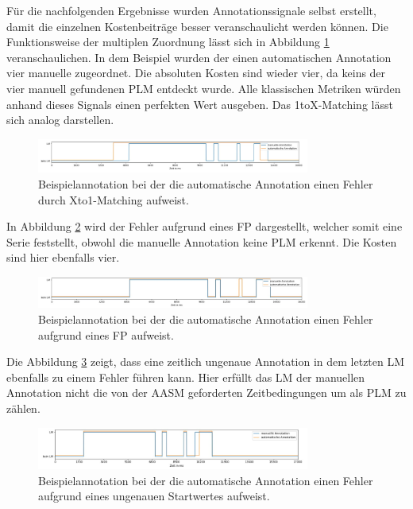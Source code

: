 Für die nachfolgenden Ergebnisse wurden Annotationssignale selbst erstellt, damit die einzelnen Kostenbeiträge besser veranschaulicht werden können.
Die Funktionsweise der multiplen Zuordnung lässt sich in Abbildung \ref{fig:Xto1} veranschaulichen. In dem Beispiel wurden der einen automatischen Annotation vier manuelle zugeordnet. Die absoluten Kosten sind wieder vier, da keins der vier manuell gefundenen PLM entdeckt wurde. Alle klassischen Metriken würden anhand dieses Signals einen perfekten Wert ausgeben. Das 1toX-Matching lässt sich analog darstellen. 

 
 \begin{figure}[!ht]%
	\begin{center}
	\includegraphics[width=0.80\textwidth]{./Bilder/Xto1.jpg}
	\end{center}
	\caption{Beispielannotation bei der die automatische Annotation einen Fehler durch Xto1-Matching aufweist.}%
	\label{fig:Xto1}%
\end{figure}

In Abbildung \ref{fig:FP} wird der Fehler aufgrund eines \gls{FP} dargestellt, welcher somit eine Serie feststellt, obwohl die manuelle Annotation keine PLM erkennt. Die Kosten sind hier ebenfalls vier.
\begin{figure}[!ht]%
	\begin{center}
	\includegraphics[width=0.80\textwidth]{./Bilder/FP.jpg}
	\end{center}
	\caption{Beispielannotation bei der die automatische Annotation einen Fehler aufgrund eines \gls{FP} aufweist.}%
	\label{fig:FP}%
\end{figure}

Die Abbildung \ref{fig:timevio} zeigt, dass eine zeitlich ungenaue Annotation in dem letzten LM ebenfalls zu einem Fehler führen kann. Hier erfüllt das LM der manuellen Annotation nicht die von der AASM geforderten Zeitbedingungen um als PLM zu zählen. 

\begin{figure}[!ht]%
	\begin{center}
	\includegraphics[width=0.80\textwidth]{./Bilder/TimeVio.jpg}
	\end{center}
	\caption{Beispielannotation bei der die automatische Annotation einen Fehler aufgrund eines ungenauen Startwertes aufweist.}%
	\label{fig:timevio}%
\end{figure}


